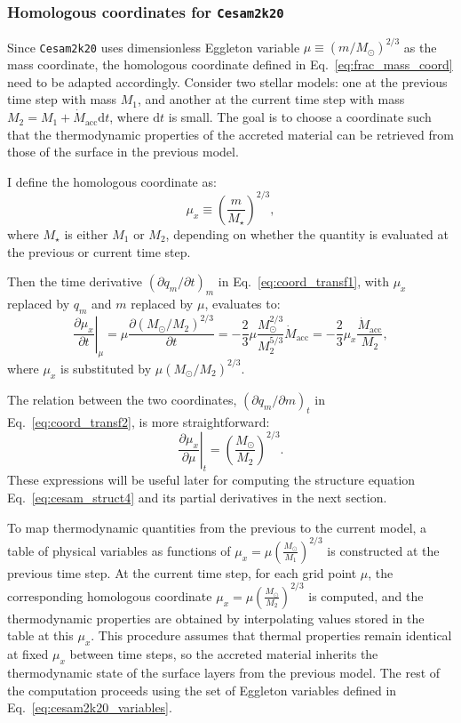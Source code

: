 \documentclass[12pt,a4paper]{article}
\newcommand{\mr}{\mathrm}
\newcommand{\pfird}[2][]{\frac{\partial#1}{\partial#2}}
\newcommand{\dd}[1]{\mathrm{d}#1}
\begin{document}
\subsubsection{Homologous coordinates for \texttt{Cesam2k20}}
\label{sec:homologous_coord_cesam}

Since \texttt{Cesam2k20} uses dimensionless Eggleton variable $\mu \equiv \left(m/M_\odot\right)^{2/3}$ as the mass coordinate, the homologous coordinate defined in Eq.~\eqref{eq:frac_mass_coord} need to be adapted accordingly. Consider two stellar models: one at the previous time step with mass $M_1$, and another at the current time step with mass $M_2 = M_1 + \dot{M}_\mr{acc} \dd{t}$, where $\dd{t}$ is small. The goal is to choose a coordinate such that the thermodynamic properties of the accreted material can be retrieved from those of the surface in the previous model.

I define the homologous coordinate as:
\begin{equation}
  \mu_x \equiv \left( \frac{m}{M_\star} \right)^{2/3},
\end{equation}
where $M_\star$ is either $M_1$ or $M_2$, depending on whether the quantity is evaluated at the previous or current time step.

Then the time derivative $\left(\partial q_m/\partial t\right)_m$ in Eq.~\eqref{eq:coord_transf1}, with $\mu_x$ replaced by $q_m$ and $m$ replaced by $\mu$, evaluates to:
\begin{equation}
  \left.\pfird[\mu_x]{t}\right|_\mu = \mu\pfird[\left(M_\odot/M_2\right)^{2/3}]{t} = -\frac{2}{3}\mu\frac{M_\odot^{2/3}}{M_2^{5/3}}\dot{M}_\mr{acc} = -\frac{2}{3}\mu_x\frac{\dot{M}_\mr{acc}}{M_2}, \label{eq:dmux_dt_mu}
\end{equation}
where $\mu_x$ is substituted by $\mu\left(M_\odot/M_2\right)^{2/3}$. 

The relation between the two coordinates, $\left(\partial q_m/\partial m\right)_t$ in Eq.~\eqref{eq:coord_transf2}, is more straightforward:
\begin{equation}
  \left.\pfird[\mu_x]{\mu}\right|_t = \left(\frac{M_\odot}{M_2}\right)^{2/3}. 
\end{equation}
These expressions will be useful later for computing the structure equation Eq.~\eqref{eq:cesam_struct4} and its partial derivatives in the next section.

To map thermodynamic quantities from the previous to the current model, a table of physical variables as functions of $\mu_x = \mu \left(\frac{M_\odot}{M_1}\right)^{2/3}$ is constructed at the previous time step. At the current time step, for each grid point $\mu$, the corresponding homologous coordinate $\mu_x = \mu \left(\frac{M_\odot}{M_2}\right)^{2/3}$ is computed, and the thermodynamic properties are obtained by interpolating values stored in the table at this $\mu_x$. This procedure assumes that thermal properties remain identical at fixed $\mu_x$ between time steps, so the accreted material inherits the thermodynamic state of the surface layers from the previous model. The rest of the computation proceeds using the set of Eggleton variables defined in Eq.~\eqref{eq:cesam2k20_variables}.
\end{document}
